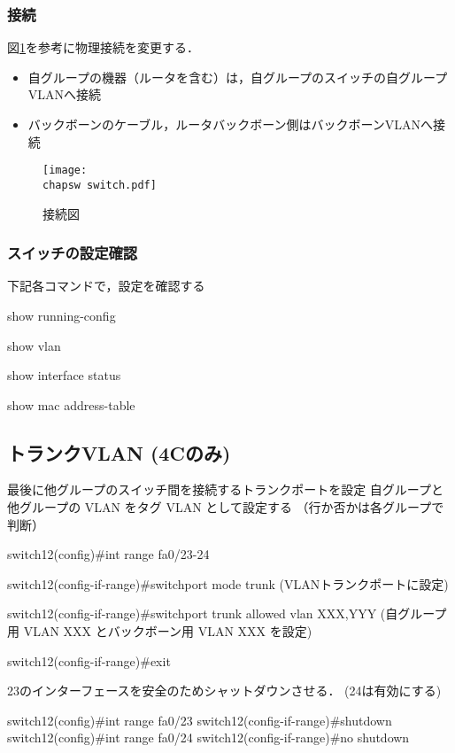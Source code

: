 \subsubsection{接続}

図\ref{fig:22:static}を参考に物理接続を変更する．

\begin{itemize}
\item 自グループの機器（ルータを含む）は，自グループのスイッチの自グループ VLANへ接続
\item バックボーンのケーブル，ルータバックボーン側はバックボーンVLANへ接続
\end{itemize}

\begin{figure}[htb]
  \begin{center}
   \texttt{[image: \\chapsw switch.pdf]}
   \caption{接続図}
   \label{fig:22:static}
  \end{center}
\end{figure}


\subsubsection{スイッチの設定確認}

\begin{cli}
下記各コマンドで，設定を確認する

show running-config

show vlan

show interface status

show mac address-table
\end{cli}

\subsection{トランクVLAN (4Cのみ)}

\begin{cli}
最後に他グループのスイッチ間を接続するトランクポートを設定
自グループと他グループの VLAN をタグ VLAN として設定する
（行か否かは各グループで判断）

switch12(config)#int range fa0/23-24

switch12(config-if-range)#switchport mode trunk
  (VLANトランクポートに設定)

switch12(config-if-range)#switchport trunk allowed vlan XXX,YYY
  (自グループ用 VLAN XXX とバックボーン用 VLAN XXX を設定)

switch12(config-if-range)#exit

23のインターフェースを安全のためシャットダウンさせる．
(24は有効にする)

switch12(config)#int range fa0/23
switch12(config-if-range)#shutdown
switch12(config)#int range fa0/24
switch12(config-if-range)#no shutdown

\end{cli}

